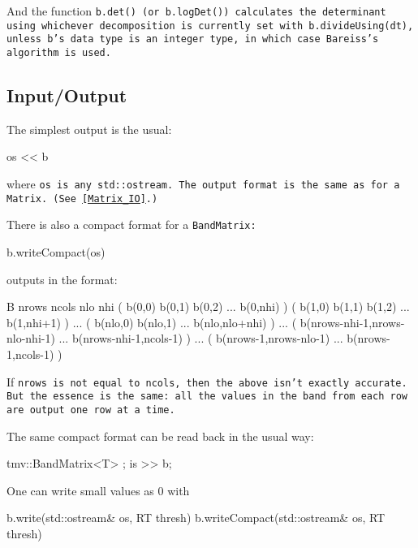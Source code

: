 And the function \tt{b.det()} (or \tt{b.logDet()}) calculates the determinant
using whichever decomposition is currently set with \tt{b.divideUsing(dt)},
unless \tt{b}'s data type is an integer type, in which case Bareiss's algorithm 
is used.

\subsection{Input/Output}
\label{BandMatrix_IO}

The simplest output is the usual:
\begin{tmvcode}
os << b
\end{tmvcode}
where \tt{os} is any \tt{std::ostream}.
The output format is the same as for a \tt{Matrix}.
(See \ref{Matrix_IO}.)

There is also a compact format for a \tt{BandMatrix}:
\begin{tmvcode}
b.writeCompact(os)
\end{tmvcode}
outputs in the format:
\begin{tmvcode}
B nrows ncols nlo nhi
( b(0,0)  b(0,1)  b(0,2) ... b(0,nhi) )
( b(1,0)  b(1,1)  b(1,2) ... b(1,nhi+1) )
...
( b(nlo,0)  b(nlo,1) ...  b(nlo,nlo+nhi) )
...
( b(nrows-nhi-1,nrows-nlo-nhi-1) ... b(nrows-nhi-1,ncols-1) )
...
( b(nrows-1,nrows-nlo-1)  ... b(nrows-1,ncols-1) )
\end{tmvcode}
If \tt{nrows} is not equal to \tt{ncols}, then the above isn't exactly accurate.  But the
essence is the same: all the values in the band from each row are output one row at a time.

The same compact format can be read back in the usual way:
\begin{tmvcode}
tmv::BandMatrix<T> ;
is >> b;
\end{tmvcode}

One can write small values as 0 with
\begin{tmvcode}
b.write(std::ostream& os, RT thresh)
b.writeCompact(std::ostream& os, RT thresh)
\end{tmvcode}

